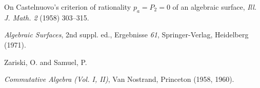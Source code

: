 {On Castelnuovo's criterion of rationality $p_a=P_2=0$ of an algebraic surface, \emph{Ill. J. Math. 2} (1958) 303--315.\par
\noindent\hangindent=25bp\hspace*{6bp}%
\emph{Algebraic Surfaces}, 2nd suppl. ed., Ergebnisse \emph{61}, Springer-Verlag, Heidelberg (1971).\par
\par\vspace{2.15pt}\noindent \hypertarget{bib-483-21}{}Zariski, O. and Samuel, P.\par
\noindent\hangindent=25bp\hspace*{6bp}%
\emph{Commutative Algebra (Vol. I, II)}, Van Nostrand, Princeton (1958, 1960).\par
}
